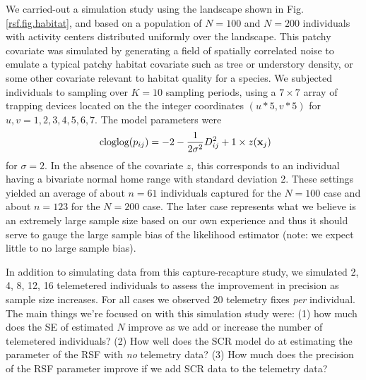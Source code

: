 We carried-out a simulation study using the landscape shown in
Fig. \ref{rsf.fig.habitat}, and based on a population of $N=100$ and $N=200$
individuals with activity centers distributed uniformly over the
landscape.  This patchy covariate was simulated by generating a field
of spatially correlated noise to emulate a typical patchy habitat
covariate such as tree or understory density, or some other covariate
relevant to habitat quality for a species.  We subjected individuals
to sampling over $K=10$ sampling periods, using a $7 \times 7$ array
of trapping devices located on the the integer coordinates $(u*5,v*5)$
for $u,v = 1,2,3,4,5,6,7$. The model parameters were
\[
\mbox{ cloglog}(p_{ij}) = -2  -\frac{1}{2\sigma^{2}} D_{ij}^{2} + 1 \times z({\bf x}_{j})
\]
for $\sigma =2$. In the absence of the covariate $z$, this corresponds
to an individual having a bivariate normal home range with standard
deviation 2.
These settings yielded an average of about $n=61$ individuals captured for
the $N=100$ case and about $n=123$ for the $N=200$ case. The later case
represents what we believe is an extremely large sample size based on
our own experience and thus it should serve to gauge the large sample
bias of the likelihood estimator (note: we expect little to no large
sample bias).

In addition to simulating data from this capture-recapture study, we
simulated 2, 4, 8, 12, 16 telemetered individuals to assess the
improvement in precision as sample size increases.  For all cases we
observed 20 telemetry fixes {\it per} individual.  The main things
we're focused on with this simulation study were: (1) how much does
the SE of estimated $N$ improve as we add or increase the number of
telemetered individuals?  (2) How well does the SCR model do at
estimating the parameter of the RSF with {\it no} telemetry data?  (3)
How much does the precision of the RSF parameter improve if we add SCR
data to the telemetry data?



